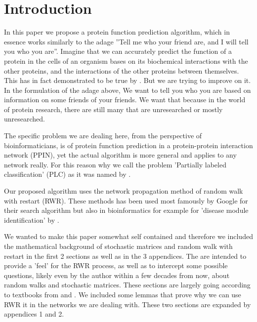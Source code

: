 \section{Introduction}

In this paper we propose a protein function prediction algorithm,
which in essence works similarly to the adage ''Tell me who your
friend are, and I will tell you who you are''. Imagine that we can
accurately predict the function of a protein in the cells of an
organism bases on its biochemical interactions with the other
proteins, and the interactions of the other proteins between
themselves. This has in fact demonstrated to be true by
\textcite{schwikowski2000network}. But we are trying to improve on
it. In the formulation of the adage above, We want to tell you who
you are based on information on some friends of your friends. 
We want that because in the world of protein research, there are
still many that are unresearched or mostly unresearched.

The specific problem we are dealing here, from the perspective of
bioinformaticians, is of protein function prediction in a
protein-protein interaction network (PPIN), yet the actual algorithm
is more general and applies to any network really. For this reason
why we call the problem 'Partially labeled classification' (PLC) as it was
named by \textcite{szummer2002partially}.

Our proposed algorithm uses the network propagation method of random
walk with restart (RWR). These methods has been used most famously
by Google for their search algorithm but also in bioinformatics  for
example for 'disease module identification' by
\cite{vandin2012discovery, barel2020netcore}.

We wanted to make this paper somewhat self contained and therefore
we included the mathematical background of stochastic matrices and random walk
with restart in the first 2 sections as well as in the 3 appendices.
The are intended to provide a 'feel' for the RWR process,
as well as to 
intercept some possible questions, likely even by the author
within a few decades from now, about random walks and stochastic matrices.
These sections are largely going according to textbooks
from \textcite{meyer2000matrix} and \textcite{herstein_winter_1989}.
We included some 
lemmas that prove why we can use RWR it in the networks we are dealing
with. These two sections are expanded by appendices 1 and 2.

